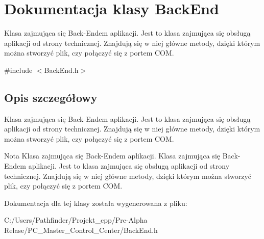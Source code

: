 \hypertarget{class_back_end}{}\section{Dokumentacja klasy Back\+End}
\label{class_back_end}


Klasa zajmująca się Back-\/\+Endem aplikacji. Jest to klasa zajmująca się obsługą aplikacji od strony technicznej. Znajdują się w niej główne metody, dzięki którym można stworzyć plik, czy połączyć się z portem C\+OM.  




{\ttfamily \#include $<$Back\+End.\+h$>$}



\subsection{Opis szczegółowy}
Klasa zajmująca się Back-\/\+Endem aplikacji. Jest to klasa zajmująca się obsługą aplikacji od strony technicznej. Znajdują się w niej główne metody, dzięki którym można stworzyć plik, czy połączyć się z portem C\+OM. 

\begin{DoxyNote}{Nota}
Klasa zajmująca się Back-\/\+Endem aplikacji. Klasa zajmująca się Back-\/\+Endem aplikacji. Jest to klasa zajmująca się obsługą aplikacji od strony technicznej. Znajdują się w niej główne metody, dzięki którym można stworzyć plik, czy połączyć się z portem C\+OM. 
\end{DoxyNote}


Dokumentacja dla tej klasy została wygenerowana z pliku\+:\begin{DoxyCompactItemize}
\item 
C\+:/\+Users/\+Pathfinder/\+Projekt\+\_\+cpp/\+Pre-\/\+Alpha Relase/\+P\+C\+\_\+\+Master\+\_\+\+Control\+\_\+\+Center/Back\+End.\+h\end{DoxyCompactItemize}
